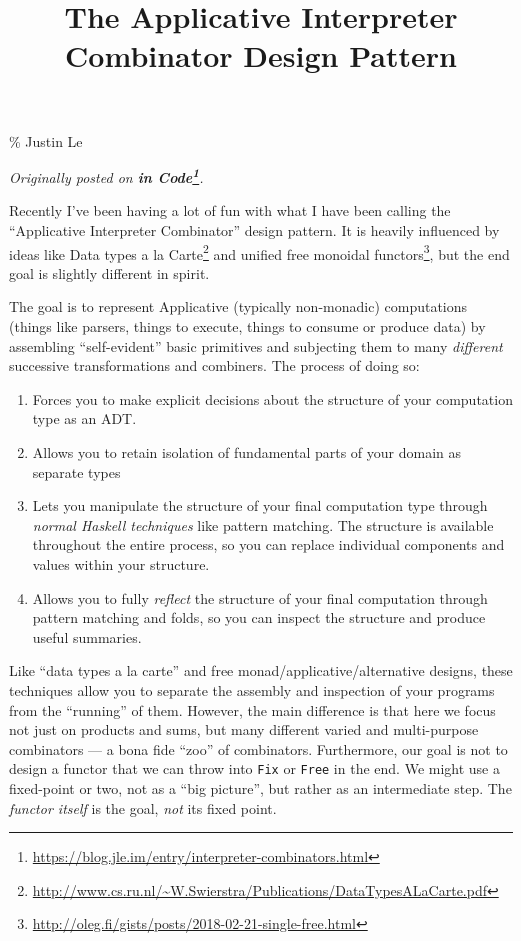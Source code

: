 \documentclass[]{article}
\title{The Applicative Interpreter Combinator Design Pattern}
\renewcommand{\href}[2]{#2\footnote{\url{#1}}}
\begin{document}
\maketitle

\% Justin Le

\emph{Originally posted on
\textbf{\href{https://blog.jle.im/entry/interpreter-combinators.html}{in
Code}}.}

Recently I've been having a lot of fun with what I have been calling the
``Applicative Interpreter Combinator'' design pattern. It is heavily influenced
by ideas like
\href{http://www.cs.ru.nl/~W.Swierstra/Publications/DataTypesALaCarte.pdf}{Data
types a la Carte} and
\href{http://oleg.fi/gists/posts/2018-02-21-single-free.html}{unified free
monoidal functors}, but the end goal is slightly different in spirit.

The goal is to represent Applicative (typically non-monadic) computations
(things like parsers, things to execute, things to consume or produce data) by
assembling ``self-evident'' basic primitives and subjecting them to many
\emph{different} successive transformations and combiners. The process of doing
so:

\begin{enumerate}
\def\labelenumi{\arabic{enumi}.}
\tightlist
\item
  Forces you to make explicit decisions about the structure of your computation
  type as an ADT.
\item
  Allows you to retain isolation of fundamental parts of your domain as separate
  types
\item
  Lets you manipulate the structure of your final computation type through
  \emph{normal Haskell techniques} like pattern matching. The structure is
  available throughout the entire process, so you can replace individual
  components and values within your structure.
\item
  Allows you to fully \emph{reflect} the structure of your final computation
  through pattern matching and folds, so you can inspect the structure and
  produce useful summaries.
\end{enumerate}

Like ``data types a la carte'' and free monad/applicative/alternative designs,
these techniques allow you to separate the assembly and inspection of your
programs from the ``running'' of them. However, the main difference is that here
we focus not just on products and sums, but many different varied and
multi-purpose combinators --- a bona fide ``zoo'' of combinators. Furthermore,
our goal is not to design a functor that we can throw into \texttt{Fix} or
\texttt{Free} in the end. We might use a fixed-point or two, not as a ``big
picture'', but rather as an intermediate step. The \emph{functor itself} is the
goal, \emph{not} its fixed point.
\end{document}
